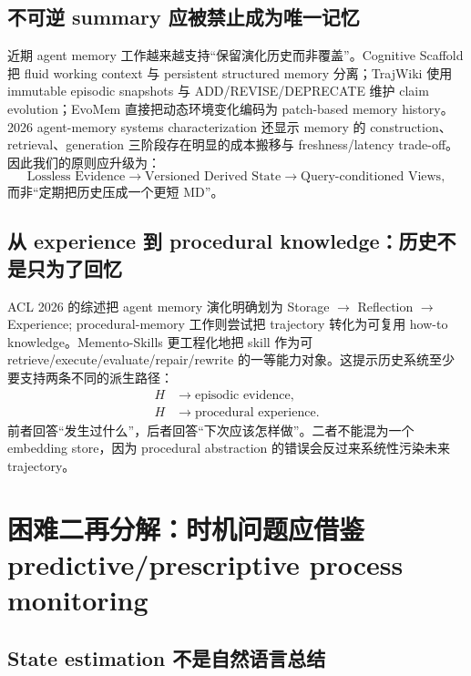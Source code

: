 \documentclass[11pt,a4paper]{ctexart}
\begin{document}
\subsection{不可逆 summary 应被禁止成为唯一记忆}

近期 agent memory 工作越来越支持“保留演化历史而非覆盖”。Cognitive Scaffold 把 fluid working context 与 persistent structured memory 分离\cite{cognitive2026scaffold}；TrajWiki 使用 immutable episodic snapshots 与 ADD/REVISE/DEPRECATE 维护 claim evolution\cite{sun2026trajwiki}；EvoMem 直接把动态环境变化编码为 patch-based memory history\cite{xu2026evoarena}。2026 agent-memory systems characterization 还显示 memory 的 construction、retrieval、generation 三阶段存在明显的成本搬移与 freshness/latency trade-off\cite{omri2026memorysystems}。因此我们的原则应升级为：
\begin{equation}
\boxed{
\text{Lossless Evidence} \to \text{Versioned Derived State} \to \text{Query-conditioned Views},
}
\end{equation}
而非“定期把历史压成一个更短 MD”。

\subsection{从 experience 到 procedural knowledge：历史不是只为了回忆}

ACL 2026 的综述把 agent memory 演化明确划为 Storage $\to$ Reflection $\to$ Experience\cite{luo2026storage}; procedural-memory 工作则尝试把 trajectory 转化为可复用 how-to knowledge\cite{cao2026procedural}。Memento-Skills 更工程化地把 skill 作为可 retrieve/execute/evaluate/repair/rewrite 的一等能力对象\cite{zhou2026memento}。这提示历史系统至少要支持两条不同的派生路径：
\begin{align}
H &\to \text{episodic evidence},\\
H &\to \text{procedural experience}.
\end{align}
前者回答“发生过什么”，后者回答“下次应该怎样做”。二者不能混为一个 embedding store，因为 procedural abstraction 的错误会反过来系统性污染未来 trajectory。

\section{困难二再分解：时机问题应借鉴 predictive/prescriptive process monitoring}

\subsection{State estimation 不是自然语言总结}
\end{document}
